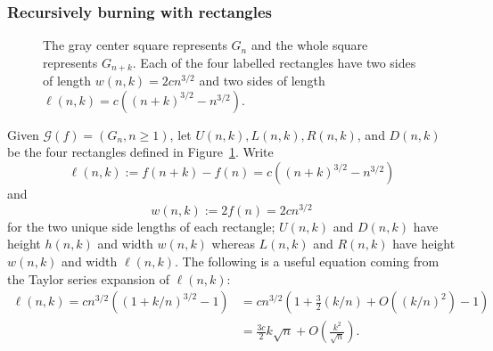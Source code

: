 \documentclass[12pt]{article}
\theoremstyle{remark}
\newcommand\cG{\mathcal G}
\begin{document}
\subsubsection{Recursively burning with rectangles}

\begin{figure}[h]

\begin{center}\end{center}

\caption{The gray center square represents $G_n$ and the whole square represents $G_{n+k}$. Each of the four labelled rectangles have two sides of length $w(n,k) = 2c n^{3/2}$ and two sides of length $\ell(n,k) = c \left( (n+k)^{3/2} - n^{3/2} \right)$.\label{fig:rectangles}}
\end{figure}

Given $\cG(f) = (G_n,n\geq 1)$, let $U(n,k),L(n,k),R(n,k)$, and $D(n,k)$ be the four rectangles defined in Figure~\ref{fig:rectangles}. Write
\[ \ell(n,k) := f(n+k) - f(n) = c \left( (n+k)^{3/2} - n^{3/2} \right)\] and
\[ w(n,k) := 2f(n) = 2c n^{3/2}\]
for the two unique side lengths of each rectangle; $U(n,k)$ and $D(n,k)$ have height $h(n,k)$ and width $w(n,k)$ whereas $L(n,k)$ and $R(n,k)$ have height $w(n,k)$ and width $\ell(n,k)$. The following is a useful equation coming from the Taylor series expansion of $\ell(n,k)$: 
\begin{equation}\label{eq:puiseux}
\begin{split}
    \ell(n,k) = c n^{3/2} \left( (1+k/n)^{3/2} - 1 \right) &= c n^{3/2} \left( 1 + \frac {3}{2} (k/n) + O \left( (k/n)^2 \right) - 1 \right)\\ 
&= \frac{3c}{2} k\sqrt{n} + O\left( \frac{k^2}{\sqrt{n}} \right).
\end{split}
\end{equation}
\end{document}
